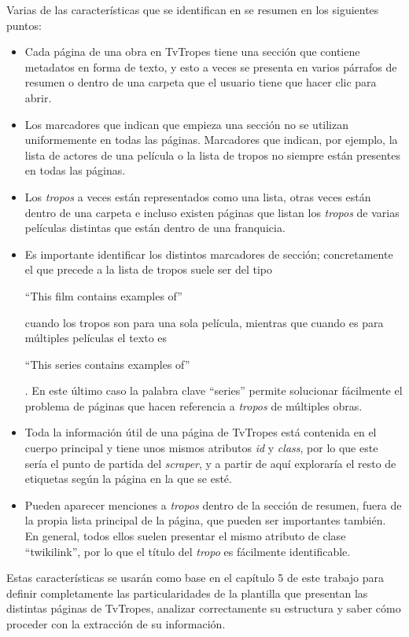 Varias de las características que se identifican en \cite{nishalscraping} se
resumen en los siguientes puntos:
\begin{itemize}
    \item Cada página de una obra en TvTropes tiene una sección que contiene
    metadatos en forma de texto, y esto a veces se presenta en varios párrafos
    de resumen o dentro de una carpeta que el usuario tiene que hacer clic para
    abrir. 
    \item Los marcadores que indican que empieza una sección no se utilizan
    uniformemente en todas las páginas. Marcadores que indican, por ejemplo, la
    lista de actores de una película o la lista de tropos no siempre están
    presentes en todas las páginas.
    \item Los \textit{tropos} a veces están representados como una lista, otras
    veces están dentro de una carpeta e incluso existen páginas que listan los
    \textit{tropos} de varias películas distintas que están dentro de una
    franquicia.
    \item Es importante identificar los distintos marcadores de sección;
    concretamente el que precede a la lista de tropos suele ser del tipo
    \begin{otherlanguage}{english} ``This film contains examples of''
    \end{otherlanguage} cuando los tropos son para una sola película, mientras
    que cuando es para múltiples películas el texto es
    \begin{otherlanguage}{english} ``This series contains examples
    of''\end{otherlanguage}. En este último caso la palabra clave ``series''
    permite solucionar fácilmente el problema de páginas que hacen referencia a
    \textit{tropos} de múltiples obras.
    \item Toda la información útil de una página de TvTropes está contenida en
    el cuerpo principal y tiene unos mismos atributos \textit{id} y
    \textit{class}, por lo que este sería el punto de partida del
    \textit{scraper}, y a partir de aquí exploraría el resto de etiquetas según
    la página en la que se esté.
    \item Pueden aparecer menciones a \textit{tropos} dentro de la sección de
    resumen, fuera de la propia lista principal de la página, que pueden ser
    importantes también. En general, todos ellos suelen presentar el mismo
    atributo de clase ``twikilink'', por lo que el título del \textit{tropo} es
    fácilmente identificable.
\end{itemize}

Estas características se usarán como base en el capítulo 5 de este trabajo para
definir completamente las particularidades de la plantilla que presentan las
distintas páginas de TvTropes, analizar correctamente su estructura y saber cómo
proceder con la extracción de su información.